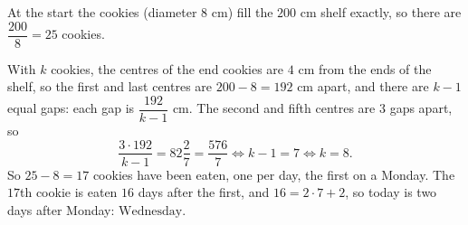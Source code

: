 At the start the cookies (diameter $8$ cm) fill the $200$ cm shelf exactly, so there are $\dfrac{200}{8}=25$ cookies.

With $k$ cookies, the centres of the end cookies are $4$ cm from the ends of the shelf, so the first and last centres are $200-8=192$ cm apart, and there are $k-1$ equal gaps: each gap is $\dfrac{192}{k-1}$ cm. The second and fifth centres are $3$ gaps apart, so
\[\dfrac{3\cdot192}{k-1}=82\dfrac27=\dfrac{576}{7}\iff k-1=7\iff k=8.\]
So $25-8=17$ cookies have been eaten, one per day, the first on a Monday. The $17$th cookie is eaten $16$ days after the first, and $16=2\cdot7+2$, so today is two days after Monday: $\boxed{\text{Wednesday}}$.
